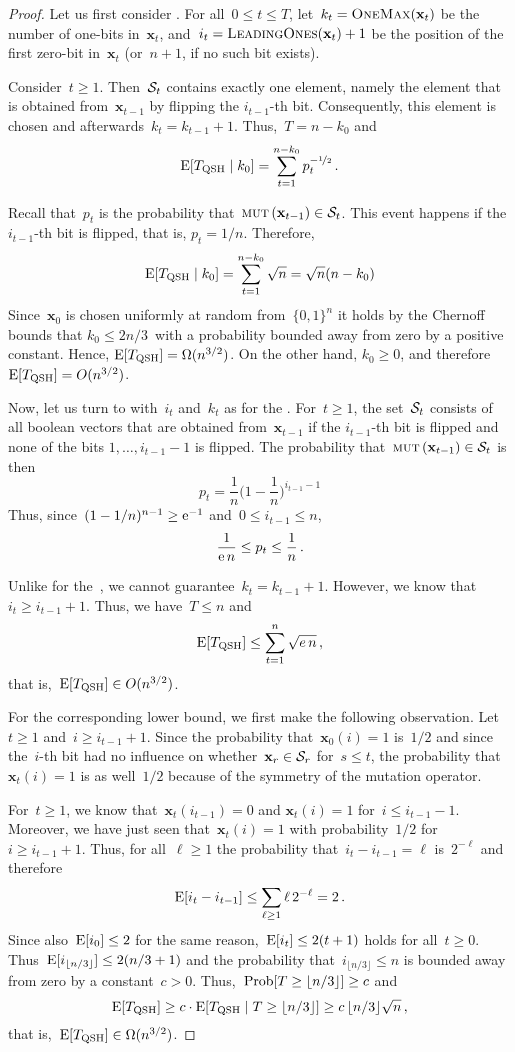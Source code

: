 \begin{proof}
Let us first consider \qrls. For all~$0\leq t \leq T$, let~$k_t=\textsc{OneMax}(\mathbf{x}_{t})$ be the number of one-bits in~$\mathbf{x}_t$, and~$i_t=\textsc{LeadingOnes}(\mathbf{x}_t)+1$ be the position of the first zero-bit in~$\mathbf{x}_t$ (or~$n+1$, if no such bit exists).

Consider~$t\ge 1$. Then~$\mathcal{S}_t$ contains exactly one element, namely the element that is obtained from~$\mathbf{x}_{t-1}$ by flipping the $i_{t-1}$-th bit. Consequently, this element is chosen and afterwards~$k_t=k_{t-1}+1$. Thus,~$T=n-k_0$ and
\[
\operatorname{E}[T_{\mathrm{QSH}}\mid k_0]=\sum_{t=1}^{n-k_0}p_t^{-\nicefrac{1}{2}}\,.
\]

Recall that~$p_t$ is the probability that~$\textsc{mut}\left(\mathbf{x}_{t-1}\right)\in\mathcal{S}_t$. This event happens if the $i_{t-1}$-th bit is flipped, that is, $p_t=1/n$. Therefore, 
\[
\operatorname{E}[T_{\mathrm{QSH}}\mid k_0] = \sum_{t=1}^{n-k_0} \sqrt{n} = \sqrt{n}(n-k_0)
\]
Since~$\mathbf{x}_0$ is chosen uniformly at random from~$\{0,1\}^n$ it holds by the Chernoff bounds \cite{MitzemacherU05} that $k_0\leq 2n/3$~with a probability bounded away from zero by a positive constant. Hence, $\operatorname{E}[T_{\mathrm{QSH}}] = \Omega(n^{3/2})$. On the other hand, $k_0 \geq 0$, and therefore~$\operatorname{E}[T_{\mathrm{QSH}}] = {O}(n^{3/2})$.

Now, let us turn to \qooea with~$i_t$ and~$k_t$ as for the \qrls. For~$t\ge 1$, the set~$\mathcal{S}_t$ consists of all boolean vectors that are obtained from~$\mathbf{x}_{t-1}$ if the $i_{t-1}$-th bit is flipped and none of the bits $1,\ldots,i_{t-1}-1$ is flipped. The probability that~$\textsc{mut}\left(\mathbf{x}_{t-1}\right)\in\mathcal{S}_t$ is then
\[
p_t = \frac{1}{n}\Big(1-\frac{1}{n}\Big)^{i_{t-1}-1}
\]
Thus, since~$(1-1/n)^{n-1}\ge\mathrm{e}^{-1}$ and~$0\le i_{t-1}\le n$,
\[
\frac{1}{\mathrm{e}\,n}\le p_t\le\frac{1}{n}\,.
\]

Unlike for the~\qrls, we cannot guarantee~$k_t=k_{t-1}+1$. However, we know that~$i_t\ge i_{t-1}+1$. Thus, we have~$T\le n$ and 
\[
\operatorname{E}[T_{\mathrm{QSH}}]\le \sum_{t=1}^n\sqrt{e\,n}\,,
\]
that is,~$\operatorname{E}[T_{\mathrm{QSH}}]\in{O}(n^{3/2})$.

For the corresponding lower bound, we first make the following observation. Let~$t\ge 1$ and~$i\ge i_{t-1}+1$. Since the probability that~$\mathbf{x}_0(i)=1$ is~$1/2$ and since the~$i$-th bit had no influence on whether~$\mathbf{x}_r\in\mathcal{S}_r$ for~$s\le t$, the probability that~$\mathbf{x}_t(i)=1$ is as well~$1/2$ because of the symmetry of the mutation operator.

For~$t\ge 1$, we know that~$\mathbf{x}_t(i_{t-1})=0$ and $\mathbf{x}_t(i)=1$ for~$i\le i_{t-1}-1$. Moreover, we have just seen that~$\mathbf{x}_{t}(i)=1$ with probability~$1/2$ for~$i\ge i_{t-1}+1$. Thus, for all~$\ell\ge 1$ the probability that~$i_t-i_{t-1}=\ell$ is~$2^{-\ell}$ and therefore
\[
\operatorname{E}[i_t-i_{t-1}]\le\sum_{\ell\ge 1}\ell\, 2^{-\ell}=2\,.
\] 
Since also~$\operatorname{E}[i_0]\leq 2$ for the same reason,~$\operatorname{E}[i_t]\le 2(t+1)$ holds for all~$t\ge 0$. Thus~$\operatorname{E}[i_{\lfloor n/3\rfloor}]\le 2(n/3+1)$ and the probability that~$i_{\lfloor n/3\rfloor}\le n$ is bounded away from zero by a constant~$c>0$. Thus,~$\mathrm{Prob}[T\ge \lfloor n/3\rfloor]\ge c$ and
\[
\operatorname{E}[T_{\mathrm{QSH}}]\ge c\cdot\operatorname{E}[T_{\mathrm{QSH}}\mid T\ge \lfloor n/3\rfloor]\ge c\,\lfloor n/3\rfloor\sqrt{n}\,,
\]
that is,~$\operatorname{E}[T_{\mathrm{QSH}}]\in\Omega(n^{3/2})$. 
\end{proof}
